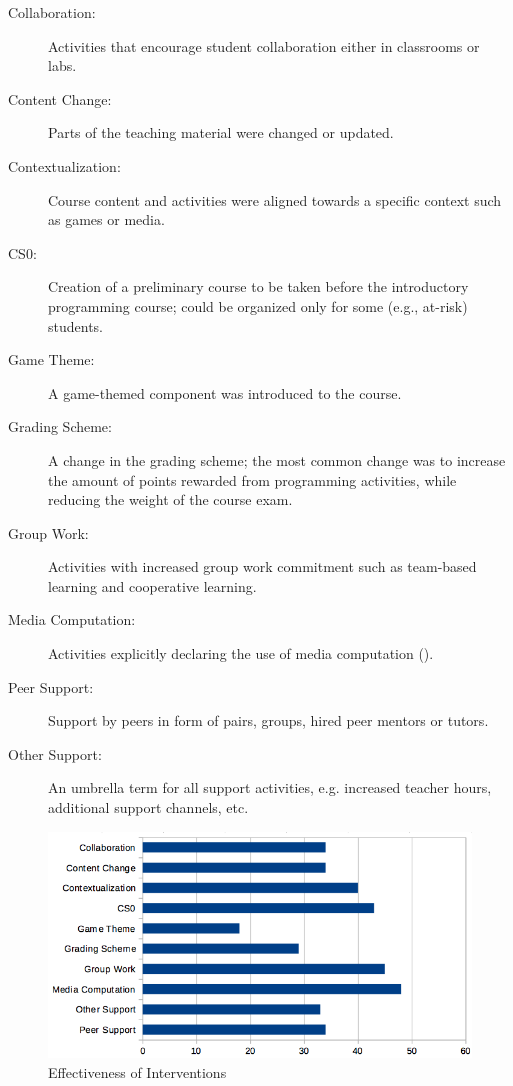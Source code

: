 \begin{description}

\item[Collaboration:] %
  Activities that encourage student collaboration either in classrooms
  or labs.

\item[Content Change:] %
  Parts of the teaching material were changed or updated.

\item[Contextualization:] %
  Course content and activities were aligned towards a specific
  context such as games or media.

\item[CS0:] %
  Creation of a preliminary course to be taken before the introductory
  programming course; could be organized only for some (e.g., at-risk)
  students.

\item[Game Theme:] %
  A game-themed component was introduced to the course.

\item[Grading Scheme:] %
  A change in the grading scheme; the most common change was to
  increase the amount of points rewarded from programming activities,
  while reducing the weight of the course exam.

\item[Group Work:] %
  Activities with increased group work commitment such as team-based
  learning and cooperative learning.

\item[Media Computation:] %
  Activities explicitly declaring the use of media computation
  ().

\item[Peer Support:] %
  Support by peers in form of pairs, groups, hired peer mentors or
  tutors.

\item[Other Support:] %
  An umbrella term for all support activities, e.g. increased teacher
  hours, additional support channels, etc.

\end{description}

\begin{figure}
\centering
\includegraphics{../docs/fig/interventions.png}
\caption{Effectiveness of Interventions}
\label{f:pck-interventions}
\end{figure}

